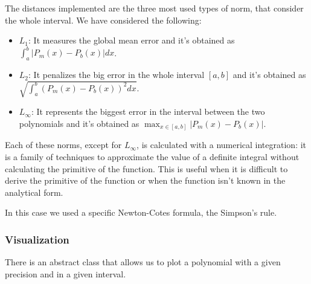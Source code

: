 The distances implemented are the three most used types of norm, that consider the whole interval. We have considered the following:
\begin{itemize}
    \item $L_1$: It measures the global mean error and it's obtained as $\displaystyle\int_a^b |P_m(x) - P_b(x)| dx$.
    \item $L_2$: It penalizes the big error in the whole interval $[a,b]$ and it's obtained as $\sqrt{\displaystyle\int_a^b (P_m(x) - P_b(x))^2 dx}$.
    \item $L_\infty$: It represents the biggest error in the interval between the two polynomials and it's obtained as $\max_{x \in [a,b]} |P_m(x) - P_b(x)|$.
\end{itemize}

\myskip

Each of these norms, except for $L_\infty$, is calculated with a numerical integration: it is a family of techniques to approximate the value of a definite integral without calculating the primitive of the function. This is useful when it is difficult to derive the primitive of the function or when the function isn't known in the analytical form.

In this case we used a specific Newton-Cotes formula, the Simpson's rule.

\subsubsection{Visualization}
There is an abstract class that allows us to plot a polynomial with a given precision and in a given interval.
